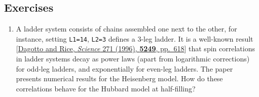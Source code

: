 \documentclass[11pt]{article}
\providecommand{\tightlist}{%
      \setlength{\itemsep}{0pt}\setlength{\parskip}{0pt}}
\begin{document}
\hypertarget{exercises}{%
\subsection{Exercises}\label{exercises}}

\begin{enumerate}
\def\labelenumi{\arabic{enumi}.}
\tightlist
\item
  A ladder system consists of chains assembled one next to the other,
  for instance, setting \texttt{L1=14}, \texttt{L2=3} defines a 3-leg
  ladder. It is a well-known result
  {[}\href{doi.org/10.1126/science.271.5249.618}{Dagotto and Rice,
  \emph{Science} 271 (1996), \textbf{5249}, pp.~618}{]} that spin
  correlations in ladder systems decay as power laws (apart from
  logarithmic corrections) for odd-leg ladders, and exponentially for
  even-leg ladders. The paper presents numerical results for the
  Heisenberg model. How do these correlations behave for the Hubbard
  model at half-filling?
\end{enumerate}


    
    
    
\end{document}
